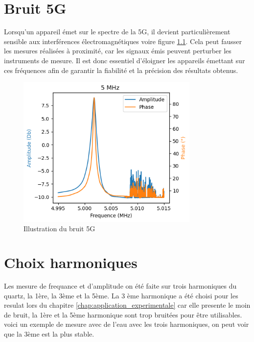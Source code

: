 \chapter{Bruit 5G}

Lorsqu'un appareil émet sur le spectre de la 5G, il devient particulièrement sensible aux interférences électromagnétiques voire figure \ref{fig:bruit-5g}. Cela peut fausser les mesures réalisées à proximité, car les signaux émis peuvent perturber les instruments de mesure. Il est donc essentiel d'éloigner les appareils émettant sur ces fréquences afin de garantir la fiabilité et la précision des résultats obtenus.
\begin{figure}[H]
    \centering
    \includegraphics[width=0.8\textwidth]{assets/figures/bruit5G.png}
    \caption{Illustration du bruit 5G}
    \label{fig:bruit-5g}
\end{figure}

\chapter{Choix harmoniques}
\label{chap:choix_harmoniques}
Les mesure de frequance et d'amplitude on été faite sur trois harmoniques du quartz, la 1ère, la 3ème et la 5ème.
La 3 ème harmonique a été choisi pour les resulat lors du chapitre \ref{chap:application_experimentale} car elle presente le moin de bruit, la 1ère et la 5ème harmonique sont trop bruitées pour être utilisables.
voici un exemple  de mesure avec de l'eau avec les trois harmoniques, on peut voir que la 3ème est la plus stable.

